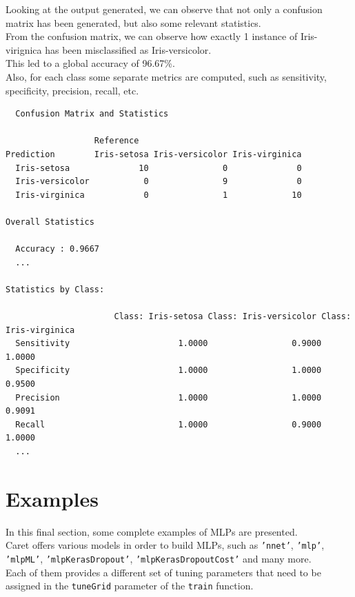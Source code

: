 \documentclass{article}
\begin{document}
\pagebreak

Looking at the output generated, we can observe that not only a confusion matrix has been generated, but also some relevant statistics.\\

From the confusion matrix, we can observe how exactly 1 instance of Iris-virignica has been misclassified as Iris-versicolor.\\
This led to a global accuracy of 96.67\%.\\

Also, for each class some separate metrics are computed, such as sensitivity, specificity, precision, recall, etc.\\

\begin{lstlisting}
  Confusion Matrix and Statistics

                  Reference
Prediction        Iris-setosa Iris-versicolor Iris-virginica
  Iris-setosa              10               0              0
  Iris-versicolor           0               9              0
  Iris-virginica            0               1             10

Overall Statistics
                           
  Accuracy : 0.9667          
  ...            

Statistics by Class:

                      Class: Iris-setosa Class: Iris-versicolor Class: Iris-virginica
  Sensitivity                      1.0000                 0.9000                1.0000
  Specificity                      1.0000                 1.0000                0.9500
  Precision                        1.0000                 1.0000                0.9091
  Recall                           1.0000                 0.9000                1.0000
  ...
\end{lstlisting}

\pagebreak

\section{Examples}
In this final section, some complete examples of MLPs are presented.\\
Caret offers various models in order to build MLPs, such as \texttt{'nnet'}, \texttt{'mlp'}, \texttt{'mlpML'}, \texttt{'mlpKerasDropout'}, \texttt{'mlpKerasDropoutCost'} and many more.\\

Each of them provides a different set of tuning parameters that need to be assigned in the \texttt{tuneGrid} parameter of the \texttt{train} function.\\
\end{document}
